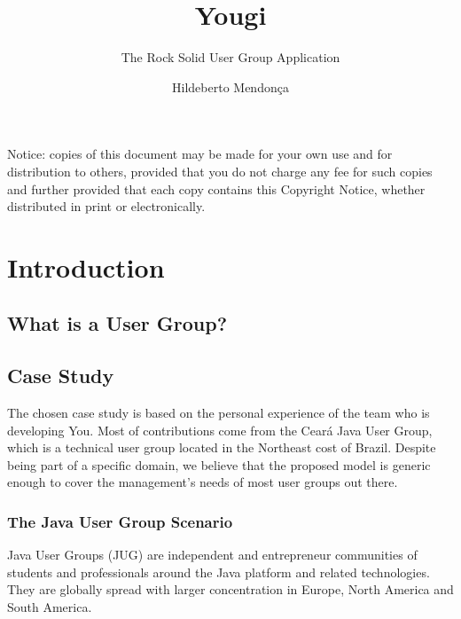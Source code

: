 \documentclass[envcountsame,envcountchap]{svmono}
\author{Hildeberto Mendon\c{c}a}
\title{Yougi}
\subtitle{The Rock Solid User Group Application}
\begin{document}
\maketitle

\frontmatter

\thispagestyle{empty}
\vspace*{3.5cm}
\begin{flushleft}
Notice: copies of this document may be made for your own use and for distribution to others, provided that you do not charge any fee for such copies and further provided that each copy contains this Copyright Notice, whether distributed in print or electronically.
\end{flushleft}

\tableofcontents

\listoffigures

\listoftables

\mainmatter

\chapter{Introduction}

\section{What is a User Group?}

\section{Case Study}

The chosen case study is based on the personal experience of the team who is developing You. Most of contributions come from the Cear\'{a} Java User Group, which is a technical user group located in the Northeast cost of Brazil. Despite being part of a specific domain, we believe that the proposed model is generic enough to cover the management's needs of most user groups out there.

\subsection{The Java User Group Scenario}

Java User Groups (JUG) are independent and entrepreneur communities of students and professionals around the Java platform and related technologies. They are globally spread with larger concentration in Europe, North America and South America.
\end{document}
